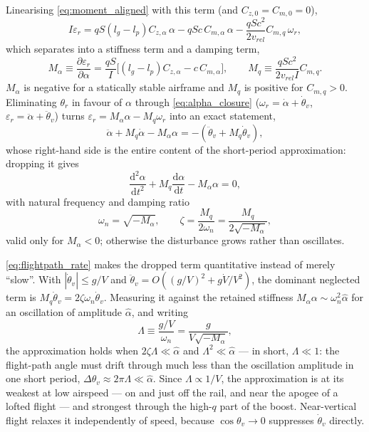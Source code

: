 Linearising \autoref{eq:moment_aligned} with this term (and $C_{z,0}=C_{m,0}=0$),
\begin{equation}
    I\varepsilon_r = qS(l_g-l_p)C_{z,\alpha}\,\alpha - qSc\,C_{m,\alpha}\,\alpha
        - \frac{qSc^2}{2v_{rel}}C_{m,q}\,\omega_r,
\end{equation}
which separates into a stiffness term and a damping term,
\begin{equation}
    M_\alpha \equiv \frac{\partial\varepsilon_r}{\partial\alpha}
        = \frac{qS}{I}\bigl[(l_g-l_p)C_{z,\alpha}-c\,C_{m,\alpha}\bigr], \qquad
    M_q \equiv \frac{qSc^2}{2v_{rel}I}C_{m,q}.
\end{equation}
$M_\alpha$ is negative for a statically stable airframe and $M_q$ is positive for $C_{m,q}>0$.
Eliminating $\theta_r$ in favour of $\alpha$ through \autoref{eq:alpha_closure}
($\omega_r=\dot\alpha+\dot\theta_v$, $\varepsilon_r=\ddot\alpha+\ddot\theta_v$) turns
$\varepsilon_r=M_\alpha\alpha-M_q\omega_r$ into an exact statement,
\begin{equation}\label{eq:short_period_exact}
    \ddot\alpha + M_q\dot\alpha - M_\alpha\alpha
        = -\left(\ddot\theta_v + M_q\dot\theta_v\right),
\end{equation}
whose right-hand side is the entire content of the short-period approximation: dropping it gives
\begin{equation}
    \frac{\mathrm{d}^2\alpha}{\mathrm{d}t^2} + M_q\frac{\mathrm{d}\alpha}{\mathrm{d}t} - M_\alpha\alpha = 0,
\end{equation}
with natural frequency and damping ratio
\begin{equation}
    \omega_n = \sqrt{-M_\alpha}, \qquad \zeta = \frac{M_q}{2\omega_n} = \frac{M_q}{2\sqrt{-M_\alpha}},
\end{equation}
valid only for $M_\alpha<0$; otherwise the disturbance grows rather than oscillates.

\autoref{eq:flightpath_rate} makes the dropped term quantitative instead of merely ``slow''. With
$|\dot\theta_v|\le g/V$ and $\ddot\theta_v=O\!\left((g/V)^2+g\dot V/V^2\right)$, the dominant
neglected term is $M_q\dot\theta_v=2\zeta\omega_n\dot\theta_v$. Measuring it against the retained
stiffness $M_\alpha\alpha\sim\omega_n^2\hat\alpha$ for an oscillation of amplitude $\hat\alpha$, and
writing
\begin{equation}\label{eq:flightpath_ratio}
    \Lambda \equiv \frac{g/V}{\omega_n} = \frac{g}{V\sqrt{-M_\alpha}},
\end{equation}
the approximation holds when $2\zeta\Lambda\ll\hat\alpha$ and $\Lambda^2\ll\hat\alpha$ --- in short,
$\Lambda\ll1$: the flight-path angle must drift through much less than the oscillation amplitude in
one short period, $\Delta\theta_v\approx2\pi\Lambda\ll\hat\alpha$. Since $\Lambda\propto1/V$, the
approximation is at its weakest at low airspeed --- on and just off the rail, and near the apogee of
a lofted flight --- and strongest through the high-$q$ part of the boost. Near-vertical flight
relaxes it independently of speed, because $\cos\theta_v\to0$ suppresses $\dot\theta_v$ directly.

